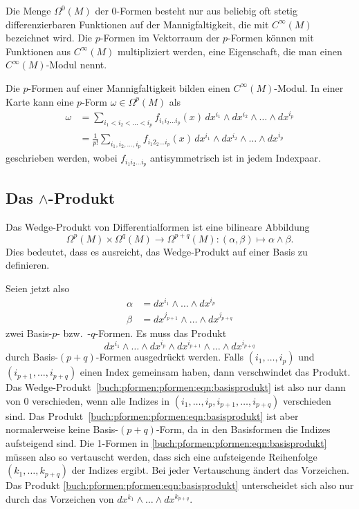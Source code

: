 Die Menge $\Omega^0(M)$ der $0$-Formen besteht nur aus beliebig oft stetig
differenzierbaren Funktionen auf der Mannigfaltigkeit, die mit
$C^\infty(M)$ bezeichnet wird.
Die $p$-Formen im Vektorraum der $p$-Formen können mit Funktionen aus
$C^\infty(M)$ multipliziert werden, eine Eigenschaft, die man einen
$C^\infty(M)$-Modul nennt.

\begin{satz}
Die $p$-Formen auf einer Mannigfaltigkeit bilden einen $C^\infty(M)$-Modul.
In einer Karte kann eine $p$-Form $\omega\in \Omega^p(M)$ als
\begin{align*}
\omega
&=
\sum_{i_1<i_2<\dots< i_p}
f_{i_1 i_2\dots i_p}(x)
\, dx^{i_1}\wedge dx^{i_2}\wedge\dots\wedge dx^{i_p}
\\
&=
\frac{1}{p!}
\sum_{i_1,i_2,\dots,i_p}
f_{i_1 2_2\dots i_p}(x)
\, dx^{i_1}\wedge dx^{i_2}\wedge\dots\wedge dx^{i_p}
\end{align*}
geschrieben werden, wobei $f_{i_1 i_2\dots i_p}$  antisymmetrisch ist in jedem
Indexpaar.
\end{satz}

%
%
\subsection{Das $\wedge$-Produkt}
Das Wedge-Produkt von Differentialformen ist eine bilineare Abbildung
\[
\Omega^p(M)\times \Omega^q(M) \to \Omega^{p+q}(M)
:
(\alpha,\beta) \mapsto \alpha\wedge\beta.
\]
Dies bedeutet, dass es ausreicht, das Wedge-Produkt auf einer Basis
zu definieren.

Seien jetzt also
\begin{align*}
\alpha &= dx^{i_1}\wedge\dots\wedge dx^{i_p} \\
\beta  &= dx^{j_{p+1}}\wedge\dots\wedge dx^{j_{p+q}}
\end{align*}
zwei Basis-$p$- bzw.~-$q$-Formen.
Es muss das Produkt
\begin{equation}
dx^{i_1}\wedge\dots\wedge dx^{i_p}
\wedge
dx^{i_{p+1}}\wedge\dots\wedge dx^{i_{p+q}}
\label{buch:pformen:pformen:eqn:basisprodukt}
\end{equation}
durch Basis-$(p+q)$-Formen ausgedrückt werden.
Falls $(i_1,\dots,i_p)$ und $(i_{p+1},\dots,i_{p+q})$ einen Index gemeinsam
haben, dann verschwindet das Produkt.
Das Wedge-Produkt~\eqref{buch:pformen:pformen:eqn:basisprodukt}
ist also nur dann von $0$ verschieden, wenn alle Indizes in
$(i_1,\dots,i_p,i_{p+1},\dots,i_{p+q})$ verschieden sind.
Das Produkt~\eqref{buch:pformen:pformen:eqn:basisprodukt} ist aber
normalerweise keine Basis-$(p+q)$-Form, da in den Basisformen die
Indizes aufsteigend sind.
Die 1-Formen in \eqref{buch:pformen:pformen:eqn:basisprodukt} müssen
also so vertauscht werden, dass sich eine aufsteigende Reihenfolge
$(k_1,\dots,k_{p+q})$
der Indizes ergibt.
Bei jeder Vertauschung ändert das Vorzeichen.
Das Produkt \eqref{buch:pformen:pformen:eqn:basisprodukt} unterscheidet
sich also nur durch das Vorzeichen von 
\(
dx^{k_1}\wedge\dots\wedge dx^{k_{p+q}}
\).

